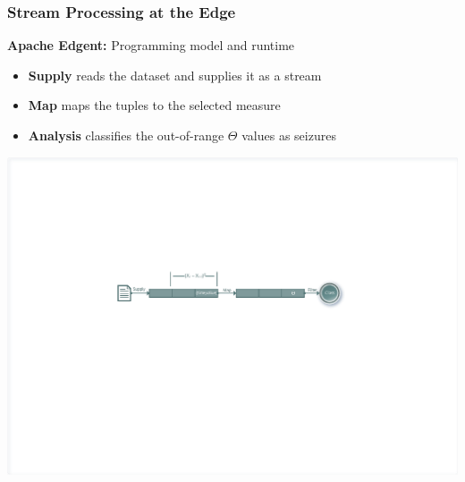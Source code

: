 \documentclass[xelatex,usenames,dvipsnames]{beamer}
\begin{document}
  \begin{frame}
    \frametitle{Stream Processing at the Edge}
    \textbf{Apache Edgent:} Programming model and runtime

    \begin{itemize} %
      \item \textbf{Supply} reads the dataset and supplies it as a stream
      \item \textbf{Map} maps the tuples to the selected measure
      \item \textbf{Analysis} classifies the out-of-range \(\Theta\) values
      as seizures
    \end{itemize}

    \includegraphics[width = \textwidth]{figs/Edgent_pipeline.pdf}
    
  \end{frame}
\end{document}
